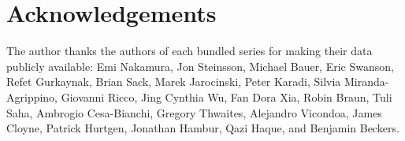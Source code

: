 \section*{Acknowledgements}\label{acknowledgements}

The author thanks the authors of each bundled series for making their data publicly available: Emi Nakamura, Jon Steinsson, Michael Bauer, Eric Swanson, Refet Gurkaynak, Brian Sack, Marek Jarocinski, Peter Karadi, Silvia Miranda-Agrippino, Giovanni Ricco, Jing Cynthia Wu, Fan Dora Xia, Robin Braun, Tuli Saha, Ambrogio Cesa-Bianchi, Gregory Thwaites, Alejandro Vicondoa, James Cloyne, Patrick Hurtgen, Jonathan Hambur, Qazi Haque, and Benjamin Beckers.



\address{%
Charles Coverdale\\
Independent\\%
London, United Kingdom\\
%
\url{https://github.com/charlescoverdale/mpshock}\\%
%
\href{mailto:charles.f.coverdale@gmail.com}{\nolinkurl{charles.f.coverdale@gmail.com}}%
}
